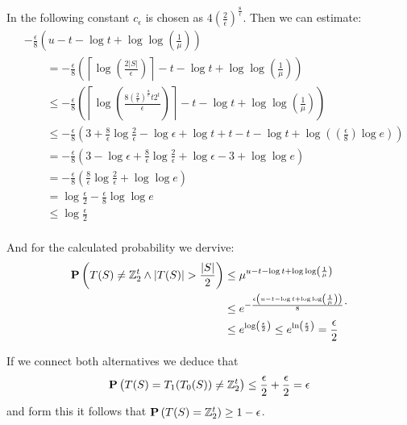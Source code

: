In the following constant $c_{\epsilon}$ is chosen as $4\left(\frac{2}{\epsilon}\right) ^ {\frac{8}{\epsilon}}$. Then we can estimate:
\[
\begin{split}
& -\frac{\epsilon}{8} \left(u - t - \log t + \log \log \left( \frac{1}{\mu} \right) \right) \\
& \qquad = -\frac{\epsilon}{8}\left(\left\lceil\log\left(\frac{2|S|}{\epsilon}\right)\right\rceil - t - \log t + \log\log\left(\frac{1}{\mu}\right)\right) \\
& \qquad \leq -\frac{\epsilon}{8} \left( \left\lceil \log\left( \frac{8 \left(\frac{2}{\epsilon}\right) ^ {\frac{8}{\epsilon}}t2^t}{\epsilon} \right) \right\rceil - t - \log t + \log\log\left(\frac{1}{\mu}\right)\right) \\
& \qquad \leq -\frac{\epsilon}{8} \left(3 + \frac{8}{\epsilon}\log\frac{2}{\epsilon} - \log\epsilon + \log t + t - t - \log t + \log \left( \left(\frac{\epsilon}{8}\right)\log e \right) \right) \\
& \qquad = -\frac{\epsilon}{8} \left(3 - \log\epsilon + \frac{8}{\epsilon} \log \frac{2}{\epsilon} + \log\epsilon - 3 + \log\log e\right) \\
& \qquad = -\frac{\epsilon}{8}\left(\frac{8}{\epsilon}\log \frac{2}{\epsilon} + \log\log e\right) \\
& \qquad = \log \frac{\epsilon}{2} - \frac{\epsilon}{8} \log\log e \\
& \qquad \leq \log\frac{\epsilon}{2} \\
\end{split}
\]

And for the calculated probability we dervive:
\[
\begin{split}
\mathbf{P}\left(T(S) \neq \mathbb{Z}_{2}^{t} \wedge |T(S)| > \frac{|S|}{2}\right) 
	& \leq \mu ^ {u - t - \log t + \log\log\left(\frac{1}{\mu}\right)} \\
	& \leq e ^ {-\frac{\epsilon\left(u - t - \log t + \log\log\left(\frac{1}{\mu}\right)\right)}{8}} \\
	& \leq e ^ {\log \left( \frac{\epsilon}{2} \right)} \leq e ^ {\ln \left(\frac{\epsilon}{2}\right)} = \frac{\epsilon}{2} \\
\end{split} \text{.}
\]

If we connect both alternatives we deduce that 
\[ 
	\mathbf{P}\left(T(S) = T_1(T_0(S)) \neq \mathbb{Z}_{2}^{t}\right) \leq \frac{\epsilon}{2} + \frac{
\epsilon}{2} = \epsilon
\]
and form this it follows that $\mathbf{P}\left(T(S) = \mathbb{Z}_{2}^{t}\right) \geq 1 - \epsilon$.
